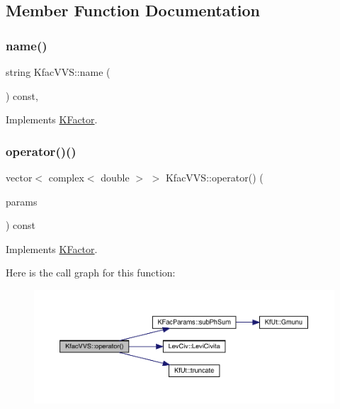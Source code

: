 \subsection{Member Function Documentation}
\mbox{\label{classKfacVVS_a2bd46e36671569204826348d5ec6d64a}} 
\subsubsection{\texorpdfstring{name()}{name()}}
{\footnotesize\ttfamily string Kfac\+V\+V\+S\+::name (\begin{DoxyParamCaption}{ }\end{DoxyParamCaption}) const\hspace{0.3cm}{\ttfamily [inline]}, {\ttfamily [virtual]}}



Implements \mbox{\hyperlink{classKFactor_ae578f8d6e4b525895427717da99cab6c}{K\+Factor}}.

\mbox{\label{classKfacVVS_ae892df7c0a0595020b968fd9c87be256}} 
\subsubsection{\texorpdfstring{operator()()}{operator()()}}
{\footnotesize\ttfamily vector$<$ complex$<$ double $>$ $>$ Kfac\+V\+V\+S\+::operator() (\begin{DoxyParamCaption}\item[{const \mbox{\hyperlink{classKFacParams}{K\+Fac\+Params}} \&}]{params }\end{DoxyParamCaption}) const\hspace{0.3cm}{\ttfamily [virtual]}}



Implements \mbox{\hyperlink{classKFactor_a012aae9ff4a07eab86d5d50b7f774285}{K\+Factor}}.

Here is the call graph for this function\+:\nopagebreak
\begin{figure}[H]
\begin{center}
\leavevmode
\includegraphics[width=350pt]{dd/d85/classKfacVVS_ae892df7c0a0595020b968fd9c87be256_cgraph}
\end{center}
\end{figure}


